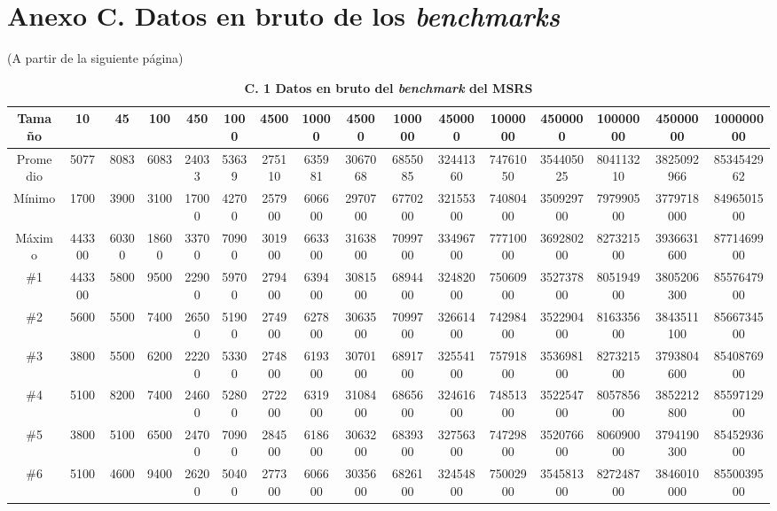\documentclass[titlepage]{article}
\begin{document}
\section*{Anexo C. Datos en bruto de los \textit{benchmarks}}
(A partir de la siguiente página)

	\begin{landscape}
		\begin{table}
			\caption*{\textbf{C. 1 Datos en bruto del \textit{benchmark} del MSRS}}
			\centering
			\smaller
			\begin{tabular}{|c|c|c|c|c|c|c|c|c|c|c|c|c|c|c|c|} 
				\hline
				Tamaño   & 10     & 45    & 100   & 450   & 1000  & 4500   & 10000  & 45000   & 100000  & 450000   & 1000000  & 4500000   & 10000000  & 45000000   & 100000000   \\ 
				\hline
				Promedio & 5077   & 8083  & 6083  & 24033 & 53639 & 275110 & 635981 & 3067068 & 6855085 & 32441360 & 74761050 & 354405025 & 804113210 & 3825092966 & 8534542962  \\ 
				\hline
				Mínimo   & 1700   & 3900  & 3100  & 17000 & 42700 & 257900 & 606600 & 2970700 & 6770200 & 32155300 & 74080400 & 350929700 & 797990500 & 3779718000 & 8496501500  \\ 
				\hline
				Máximo   & 443300 & 60300 & 18600 & 33700 & 70900 & 301900 & 663300 & 3163800 & 7099700 & 33496700 & 77710000 & 369280200 & 827321500 & 3936631600 & 8771469900  \\ 
				\hline
				\#1      & 443300 & 5800  & 9500  & 22900 & 59700 & 279400 & 639400 & 3081500 & 6894400 & 32482000 & 75060900 & 352737800 & 805194900 & 3805206300 & 8557647900  \\ 
				\hline
				\#2      & 5600   & 5500  & 7400  & 26500 & 51900 & 274900 & 627800 & 3063500 & 7099700 & 32661400 & 74298400 & 352290400 & 816335600 & 3843511100 & 8566734500  \\ 
				\hline
				\#3      & 3800   & 5500  & 6200  & 22200 & 53300 & 274800 & 619300 & 3070100 & 6891700 & 32554100 & 75791800 & 353698100 & 827321500 & 3793804600 & 8540876900  \\ 
				\hline
				\#4      & 5100   & 8200  & 7400  & 24600 & 52800 & 272200 & 631900 & 3108400 & 6865600 & 32461600 & 74851300 & 352254700 & 805785600 & 3852212800 & 8559712900  \\ 
				\hline
				\#5      & 3800   & 5100  & 6500  & 24700 & 70900 & 284500 & 618600 & 3063200 & 6839300 & 32756300 & 74729800 & 352076600 & 806090000 & 3794190300 & 8545293600  \\ 
				\hline
				\#6      & 5100   & 4600  & 9400  & 26200 & 50400 & 277300 & 606600 & 3035600 & 6826100 & 32454800 & 75002900 & 354581300 & 827248700 & 3846010000 & 8550039500  \\ 

\end{tabular}
\end{table}
\end{landscape}
\end{document}
